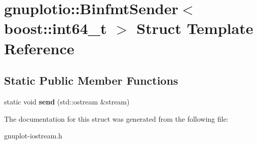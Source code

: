 \hypertarget{structgnuplotio_1_1BinfmtSender_3_01boost_1_1int64__t_01_4}{}\section{gnuplotio\+:\+:Binfmt\+Sender$<$ boost\+:\+:int64\+\_\+t $>$ Struct Template Reference}
\label{structgnuplotio_1_1BinfmtSender_3_01boost_1_1int64__t_01_4}
\subsection*{Static Public Member Functions}
\begin{DoxyCompactItemize}
\item 
\mbox{\label{structgnuplotio_1_1BinfmtSender_3_01boost_1_1int64__t_01_4_a57423f02a4526e15d7d821606b1c8c81}} 
static void {\bfseries send} (std\+::ostream \&stream)
\end{DoxyCompactItemize}


The documentation for this struct was generated from the following file\+:\begin{DoxyCompactItemize}
\item 
gnuplot-\/iostream.\+h\end{DoxyCompactItemize}
